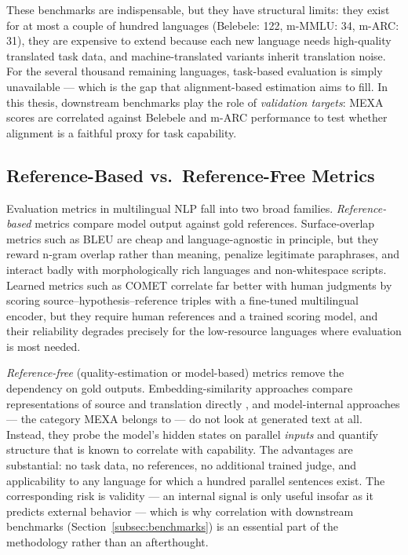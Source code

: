 These benchmarks are indispensable, but they have structural limits: they
exist for at most a couple of hundred languages (Belebele: 122, m-MMLU:
34, m-ARC: 31), they are expensive to extend because each new language
needs high-quality translated task data, and machine-translated variants
inherit translation noise. For the several thousand remaining languages,
task-based evaluation is simply unavailable --- which is the gap that
alignment-based estimation aims to fill. In this thesis, downstream
benchmarks play the role of \emph{validation targets}: MEXA scores are
correlated against Belebele and m-ARC performance to test whether
alignment is a faithful proxy for task capability.

\subsection{Reference-Based vs.\ Reference-Free Metrics}
\label{subsec:metrics}

Evaluation metrics in multilingual NLP fall into two broad families.
\emph{Reference-based} metrics compare model output against gold
references. Surface-overlap metrics such as BLEU
\citep{papineni2002bleu} are cheap and language-agnostic in principle, but
they reward n-gram overlap rather than meaning, penalize legitimate
paraphrases, and interact badly with morphologically rich languages and
non-whitespace scripts. Learned metrics such as COMET \citep{rei2020comet}
correlate far better with human judgments by scoring
source--hypothesis--reference triples with a fine-tuned multilingual
encoder, but they require human references and a trained scoring model,
and their reliability degrades precisely for the low-resource languages
where evaluation is most needed.

\emph{Reference-free} (quality-estimation or model-based) metrics remove
the dependency on gold outputs. Embedding-similarity approaches compare
representations of source and translation directly
\citep{reimers2020multilingual}, and model-internal approaches --- the
category MEXA belongs to --- do not look at generated text at all.
Instead, they probe the model's hidden states on parallel \emph{inputs}
and quantify structure that is known to correlate with capability. The
advantages are substantial: no task data, no references, no additional
trained judge, and applicability to any language for which a hundred
parallel sentences exist. The corresponding risk is validity --- an
internal signal is only useful insofar as it predicts external behavior
--- which is why correlation with downstream benchmarks
(Section~\ref{subsec:benchmarks}) is an essential part of the methodology
rather than an afterthought.

